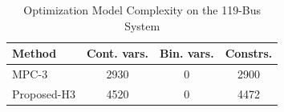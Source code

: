 \begin{table}[t]
\caption{Optimization Model Complexity on the 119-Bus System}
\label{tab:model_complexity_119}
\centering
\scriptsize
\setlength{\tabcolsep}{4.0pt}
\begin{tabular}{lccc}
\toprule
Method & Cont. vars. & Bin. vars. & Constrs. \\
\midrule
MPC-3 & 2930 & 0 & 2900 \\
Proposed-H3 & 4520 & 0 & 4472 \\
\bottomrule
\end{tabular}
\end{table}
